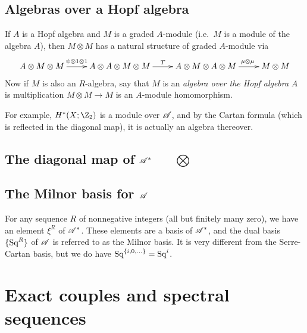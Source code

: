 \documentclass[11pt]{article}
\begin{document}
{\subsection{Algebras over a Hopf algebra}
If $A$ is a Hopf algebra and $M$ is a graded $A$-module (i.e.\ $M$ is a module of the algebra $A$), then $M\otimes M$ has a natural structure of graded $A$-module via
\[\xymatrix{
A\otimes M\otimes M\ar[r]^{\psi\otimes1\otimes1\ \ \ }&A\otimes A\otimes M\otimes M\ar[r]^T&A\otimes M\otimes A\otimes M\ar[r]^{\qquad\mu\otimes \mu\ }&M\otimes M
}\]
Now if $M$ is also an $R$-algebra, say that $M$ is an \emph{algebra over the Hopf algebra} $A$ is multiplication $M\otimes M\to M$ is an $A$-module homomorphism.

For example, $H^*(X;\Z_2)$ is a module over $\mathscr{A}$, and by the Cartan formula (which is reflected in the diagonal map), it is actually an algebra thereover.
\subsection{The diagonal map of \texorpdfstring{$\mathscr{A}^*$\ \ \ $\bigotimes$}{A}}
\subsection{The Milnor basis for \texorpdfstring{$\mathscr{A}$}{A}}
For any sequence $R$ of nonnegative integers (all but finitely many zero), we have an element $\xi^R$ of $\mathscr{A}^*$. These elements are a basis of $\mathscr{A}^*$, and the dual basis $\{\textup{Sq}^R\}$ of $\mathscr{A}$ is referred to as the Milnor basis. It is very different from the Serre-Cartan basis, but we do have $\textup{Sq}^{\{i,0,\ldots\}}=\textup{Sq}^i$.

\section{Exact couples and spectral sequences}
\setcounter{subsection}{5}
}
\end{document}
